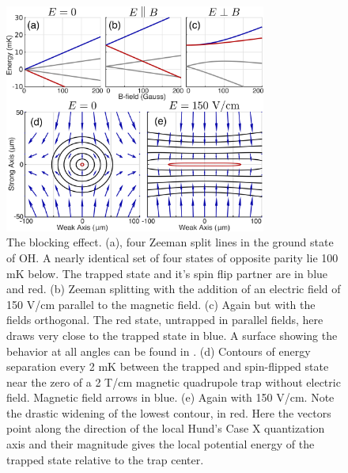 \documentclass[%
 reprint,
 amsmath,amssymb,
 aps,
prl,
]{revtex4-1}
\begin{document}
\begin{figure}
\includegraphics[width=86mm]{blocking.png}%
\caption{
The blocking effect. (a), four Zeeman split lines in the ground state of OH. A nearly identical set of four states of opposite parity lie 100 mK below. The trapped state and it's spin flip partner are in blue and red. (b) Zeeman splitting with the addition of an electric field of 150 V/cm parallel to the magnetic field. (c) Again but with the fields orthogonal. The red state, untrapped in parallel fields, here draws very close to the trapped state in blue. A surface showing the behavior at all angles can be found in \cite{Stuhl2013}. (d) Contours of energy separation every 2 mK between the trapped and spin-flipped state near the zero of a 2 T/cm magnetic quadrupole trap without electric field. Magnetic field arrows in blue. (e) Again with 150 V/cm. Note the drastic widening of the lowest contour, in red. Here the vectors point along the direction of the local Hund's Case X quantization axis \cite{Bohn2013} and their magnitude gives the local potential energy of the trapped state relative to the trap center.
\label{fig:blocking}}
\end{figure}
\end{document}
